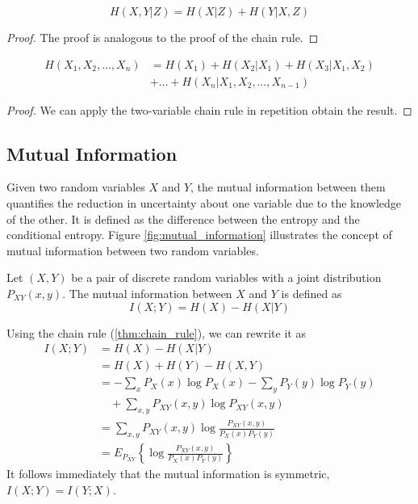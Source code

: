 \begin{corollary}
    \begin{equation}
        H(X, Y|Z) = H(X|Z) + H(Y|X,Z)
    \end{equation}
\end{corollary}
\begin{proof}
    The proof is analogous to the proof of the chain rule.
\end{proof}

\begin{corollary}
    \begin{align}
        H(X_1, X_2, \ldots, X_n) & = H(X_1) + H(X_2|X_1) + H(X_3|X_1, X_2) \nonumber \\
                                 & + \ldots + H(X_n|X_1, X_2, \ldots, X_{n-1})
    \end{align}
\end{corollary}
\begin{proof}
    We can apply the two-variable chain rule in repetition obtain the result.
\end{proof}

\subsection{Mutual Information}
Given two random variables $X$ and $Y$, the mutual information between them quantifies the reduction in uncertainty about one variable due to the knowledge of the other. It is defined as the difference between the entropy and the conditional entropy. Figure \ref{fig:mutual_information} illustrates the concept of mutual information between two random variables.

\begin{definition}\label{def:mutual_information}
    Let $(X,Y)$ be a pair of discrete random variables with a joint distribution $P_{XY}(x,y)$. The mutual information between $X$ and $Y$ is defined as
    \begin{equation}
        I(X;Y) = H(X) - H(X|Y)
    \end{equation}
\end{definition}
\noindent Using the chain rule (\ref{thm:chain_rule}), we can rewrite it as
\begin{align}
    I(X;Y) & = H(X) - H(X|Y) \nonumber                                           \\
           & = H(X) + H(Y) - H(X,Y)                                              \\
           & = -\sum_x P_X(x)\log P_X(x) - \sum_y P_Y(y)\log P_Y(y) \nonumber    \\
           & \quad + \sum_{x,y} P_{XY}(x,y)\log P_{XY}(x,y)                      \\
           & = \sum_{x,y} P_{XY}(x,y)\log \frac{P_{XY}(x,y)}{P_X(x)P_Y(y)}       \\
           & = E_{P_{XY}} \left\{ \log \frac{P_{XY}(x,y)}{P_X(x)P_Y(y)} \right\}
\end{align}
It follows immediately that the mutual information is symmetric, $I(X;Y) = I(Y;X)$.

